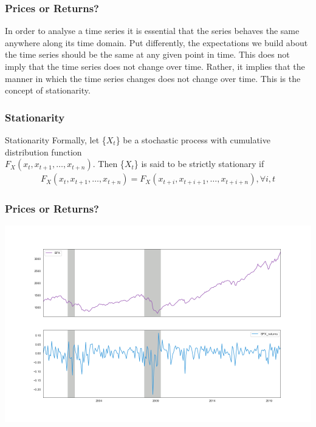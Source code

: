 \documentclass[xcolor=dvipsnames, english, 8pt]{beamer}
\begin{document}
\begin{frame}
    \frametitle{Prices or Returns?}
    In order to analyse a time series it is essential that the series behaves the same anywhere along its time domain. Put differently, the expectations we build about the time series should be the same at any given point in time. This does not imply that the time series does not change over time. Rather, it implies that the manner in which the time series changes does not change over time. This is the concept of {\color{ubRed} stationarity}.
\end{frame}

\begin{frame}
    \frametitle{Stationarity}
    \begin{block}{Stationarity}
    Formally, let \{$X_t$\} be a stochastic process with cumulative distribution function\\
     $F_X (x_t, x_{t+1}, \hdots , x_{t+n})$. Then \{$X_t$\} is said to be strictly stationary if
    \begin{align}
        F_X (x_t, x_{t+1}, \hdots ,x_{t+n}) = F_X (x_{t+i}, x_{t+i+1}, \hdots , x_{t+i+n}), \forall i,t
    \end{align}
\end{block}

\end{frame}

\begin{frame}
    \frametitle{Prices or Returns?}
\begin{center}
    \includegraphics[scale=0.30]{SPX}
\end{center}
\end{frame}
\end{document}
